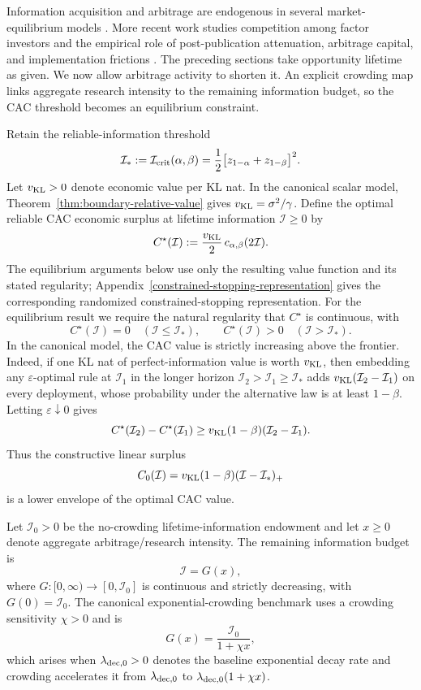 \documentclass[11pt]{article}
\numberwithin{equation}{section}
\theoremstyle{plain}
\theoremstyle{definition}
\theoremstyle{remark}
\begin{document}
Information acquisition and arbitrage are endogenous in several market-equilibrium models \cite{grossmanstiglitz1980,basakcroitoru2006,zigrand2004,zigrand2006}. More recent work studies competition among factor investors and the empirical role of post-publication attenuation, arbitrage capital, and implementation frictions \cite{demiguel2025,mcleanpontiff2016,jacobsmuller2020,kaplanski2023,muravyev2025}. The preceding sections take opportunity lifetime as given. We now allow arbitrage activity to shorten it. An explicit crowding map links aggregate research intensity to the remaining information budget, so the CAC threshold becomes an equilibrium constraint.

Retain the reliable-information threshold
\[
\mathcal I_*:=\mathcal I_{\rm crit}(\alpha,\beta)
=\frac12\bigl[z_{1-\alpha}+z_{1-\beta}\bigr]^2.
\]
Let ${v_{\rm KL}}>0$ denote economic value per KL nat. In the canonical scalar model, Theorem~\ref{thm:boundary-relative-value} gives ${v_{\rm KL}}=\sigma^2/\gamma$. Define the optimal reliable CAC economic surplus at lifetime information $\mathcal I\ge0$ by
\[
C^\star(\mathcal I):=\frac {v_{\rm KL}}2\,c_{\alpha,\beta}(2\mathcal I).
\]
The equilibrium arguments below use only the resulting value function and its stated regularity; Appendix~\ref{constrained-stopping-representation} gives the corresponding randomized constrained-stopping representation. For the
equilibrium result we require the natural regularity that \(C^\star\) is
continuous, with
\[
C^\star(\mathcal I)=0\quad(\mathcal I\le \mathcal I_*),
\qquad
C^\star(\mathcal I)>0\quad(\mathcal I>\mathcal I_*).
\]
In the canonical model, the CAC value is strictly increasing above the frontier. Indeed, if
one KL nat of perfect-information value is worth \({v_{\rm KL}}\), then embedding any $\varepsilon$-optimal
rule at \(\mathcal I_1\) in the longer horizon \(\mathcal I_2>\mathcal I_1\ge \mathcal I_*\) adds
\({v_{\rm KL}}(\mathcal I_2-\mathcal I_1)\) on every deployment, whose probability under the alternative law
is at least \(1-\beta\). Letting $\varepsilon\downarrow0$ gives
\[
C^\star(\mathcal I_2)-C^\star(\mathcal I_1)
\ge {v_{\rm KL}}(1-\beta)(\mathcal I_2-\mathcal I_1).
\]
Thus the constructive linear surplus
\[
C_0(\mathcal I)={v_{\rm KL}}(1-\beta)(\mathcal I-\mathcal I_*)_+
\]
is a lower envelope of the optimal CAC value.

Let $\mathcal I_0>0$ be the no-crowding lifetime-information endowment and let
$x\ge0$ denote aggregate arbitrage/research intensity.  The remaining information budget is
\[
\mathcal I=G(x),
\]
where $G:[0,\infty)\to[0,\mathcal I_0]$ is continuous and strictly decreasing,
with $G(0)=\mathcal I_0$. The canonical exponential-crowding benchmark uses a crowding sensitivity $\chi>0$ and is
\[
G(x)=\frac{\mathcal I_0}{1+\chi x},
\]
which arises when ${\lambda_{{\rm dec},0}}>0$ denotes the baseline exponential decay rate and crowding accelerates it from
\({\lambda_{{\rm dec},0}}\) to \({\lambda_{{\rm dec},0}}(1+\chi x)\).
\end{document}
